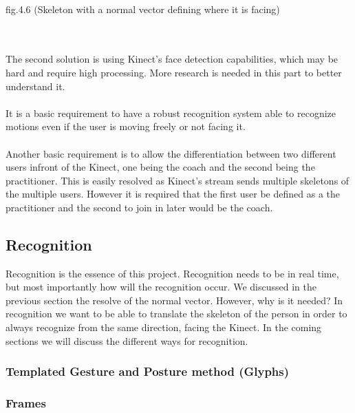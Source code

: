 \\
\centerline{fig.4.6 (Skeleton with a normal vector defining where it is facing)}
\\
\\
The second solution is using Kinect's face detection capabilities, which may be hard and require high processing. More research is needed in this part to better understand it.
\\
\\
It is a basic requirement to have a robust recognition system able to recognize motions even if the user is moving freely or not facing it.
\\
\\
Another basic requirement is to allow the differentiation between two different users infront of the Kinect, one being the coach and the second being the practitioner. This is easily resolved as Kinect's stream sends multiple skeletons of the multiple users. However it is required that the first user be defined as a the practitioner and the second to join in later would be the coach.
\subsection{Recognition}
Recognition is the essence of this project. Recognition needs to be in real time, but most importantly how will the recognition occur. We discussed in the previous section the resolve of the normal vector. However, why is it needed? In recognition we want to be able to translate the skeleton of the person in order to always recognize from the same direction, facing the Kinect. In the coming sections we will discuss the different ways for recognition.
\subsubsection{Templated Gesture and Posture method (Glyphs)}
\subsubsection{Frames}